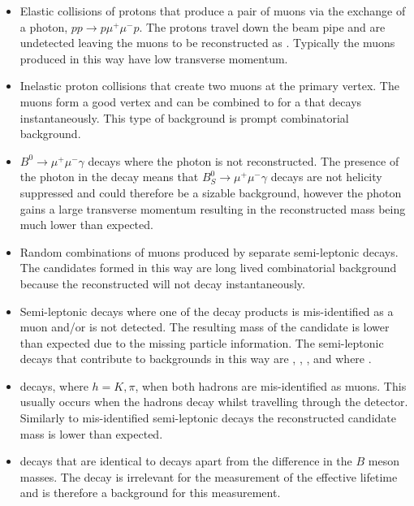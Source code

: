 \begin{itemize}
\item Elastic collisions of protons that produce a pair of muons via the exchange of a photon, $pp \to p \mu^{+} \mu^{-} p$. The protons travel down the beam pipe and are undetected leaving the muons to be reconstructed as \bsmumu. Typically the muons produced in this way have low transverse momentum. %
\item Inelastic proton collisions that create two muons at the primary vertex. The muons form a good vertex and can be combined to for a \bs that decays instantaneously. This type of background is prompt combinatorial background. 
\item $B_{}^{0}\to\mu^{+}\mu^{-}\gamma$ decays where the photon is not reconstructed. The presence of the photon in the decay means that $B_{S}^{0}\to\mu^{+}\mu^{-}\gamma$ decays are not helicity suppressed and could therefore be a sizable background, however the photon gains a large transverse momentum resulting in the reconstructed \bs mass being much lower than expected.
\item Random combinations of muons produced by separate semi-leptonic decays. The \bsmumu candidates formed in this way are long lived combinatorial background because the reconstructed \bs will not decay instantaneously. %
\item Semi-leptonic decays where one of the decay products is mis-identified as a muon and/or is not detected. The resulting mass of the \bs candidate is lower than expected due to the missing particle information. The semi-leptonic decays that contribute to \bsmumu backgrounds in this way are \bdpimunu, \bsKmunu, \bpimumu, \bdpimumu and \bcjpsimunu where \jpsimumu. %
\item \bhh decays, where $ h  = K, \pi$, when both hadrons are mis-identified as muons. This usually occurs when the hadrons decay whilst travelling through the detector. Similarly to mis-identified semi-leptonic decays the reconstructed \bs candidate mass is lower than expected. %
\item \bdmumu decays that are identical to \bsmumu decays apart from the difference in the $B$ meson masses. The \bd decay is irrelevant for the measurement of the \bsmumu effective lifetime and is therefore a background for this measurement.
\end{itemize}

